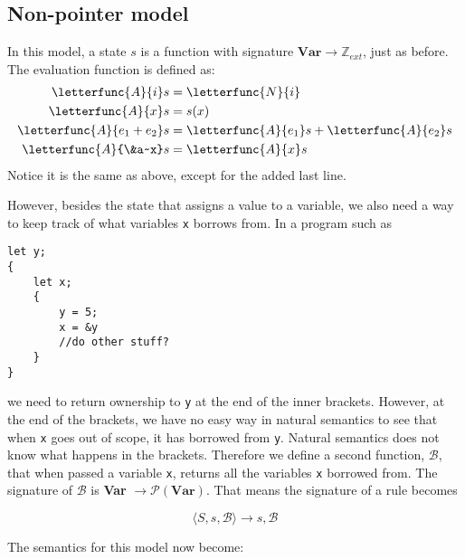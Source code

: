 \subsection{Non-pointer model}
In this model, a state $s$ is a function with signature $\textbf{Var} \to \mathbb{Z}_{ext}$, just as before. The evaluation function is defined as:
\begin{align*}
    \letterfunc{A}{i}s          &= \letterfunc{N}{i}
\\  \letterfunc{A}{x}s          &= s(x)
\\  \letterfunc{A}{e_1 + e_2}s  &= \letterfunc{A}{e_1}s + \letterfunc{A}{e_2}s
\\ \letterfunc{A}{\&a~x}s       &= \letterfunc{A}{x}s
\end{align*}
Notice it is the same as above, except for the added last line. 

However, besides the state that assigns a value to a variable, we also need a way to keep track of what variables \verb|x| borrows from. In a program such as 
\begin{verbatim}
let y;
{
    let x;
    {
        y = 5;
        x = &y
        //do other stuff?
    }
}
\end{verbatim}
we need to return ownership to \verb|y| at the end of the inner brackets. However, at the end of the brackets, we have no easy way in natural semantics to see that when \verb|x| goes out of scope, it has borrowed from \verb|y|. Natural semantics does not know what happens in the brackets. Therefore we define a second function, $\mathcal{B}$, that when passed a variable \verb|x|, returns all the variables \verb|x| borrowed from. The signature of $\mathcal{B}$ is \textbf{Var} $\to \mathcal{P}(\textbf{Var})$. That means the signature of a rule becomes 

$$\langle S, s, \mathcal{B} \rangle \to s, \mathcal{B}$$

The semantics for this model now become:

